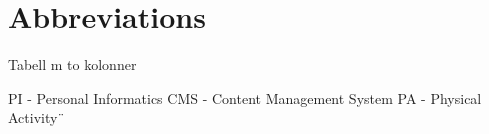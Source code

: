 \chapter{Abbreviations}

Tabell m to kolonner

PI - Personal Informatics
CMS - Content Management System
PA - Physical Activity¨
